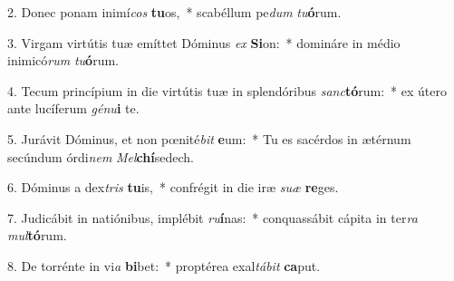 2. Donec ponam inimí\textit{cos} \textbf{tu}os,~*  scabéllum pe\textit{dum} \textit{tu}\textbf{ó}rum.\

3. Virgam virtútis tuæ emíttet Dóminus \textit{ex} \textbf{Si}on:~*  domináre in médio inimicó\textit{rum} \textit{tu}\textbf{ó}rum.\

4. Tecum princípium in die virtútis tuæ in splendóribus \textit{sanc}\textbf{tó}rum:~*  ex útero ante lucíferum \textit{gé}\textit{nu}\textbf{i} te.\

5. Jurávit Dóminus, et non pœnité\textit{bit} \textbf{e}um:~*  Tu es sacérdos in ætérnum secúndum órdi\textit{nem} \textit{Mel}\textbf{chí}sedech.\

6. Dóminus a dex\textit{tris} \textbf{tu}is,~*  confrégit in die iræ \textit{su}\textit{æ} \textbf{re}ges.\

7. Judicábit in natiónibus, implébit \textit{ru}\textbf{í}nas:~*  conquassábit cápita in ter\textit{ra} \textit{mul}\textbf{tó}rum.\

8. De torrénte in vi\textit{a} \textbf{bi}bet:~*  proptérea exal\textit{tá}\textit{bit} \textbf{ca}put.\

